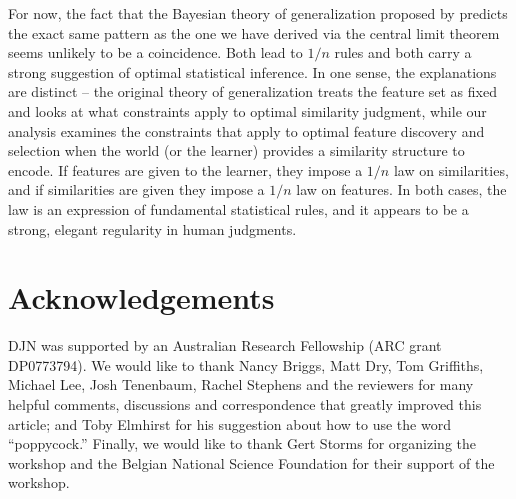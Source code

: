 \documentclass{apa}
\begin{document}
For now, the fact that the Bayesian theory of generalization proposed by  predicts the exact same pattern as the one we have derived via the central limit theorem seems unlikely to be a coincidence. Both lead to $1/n$ rules and both carry a strong suggestion of optimal statistical inference. In one sense, the explanations are distinct -- the original theory of generalization treats the feature set as fixed and looks at what constraints apply to optimal similarity judgment, while our analysis examines the constraints that apply to optimal feature discovery and selection when the world (or the learner) provides a similarity structure to encode. If features are given to the learner, they impose a $1/n$ law on similarities, and if similarities are given they impose a $1/n$ law on features. In both cases, the law is an expression of fundamental statistical rules, and it appears to be a strong, elegant regularity in human judgments.

\section{Acknowledgements}

DJN was supported by an Australian Research Fellowship (ARC grant DP0773794). We would like to thank Nancy Briggs, Matt Dry, Tom Griffiths, Michael Lee, Josh Tenenbaum, Rachel Stephens and the reviewers for many helpful comments, discussions and correspondence that greatly improved this article; and Toby Elmhirst for his suggestion about how to use the word ``poppycock.'' Finally, we would like to thank Gert Storms for organizing the workshop and the Belgian National Science Foundation for their support of the workshop.

%

\end{document}
